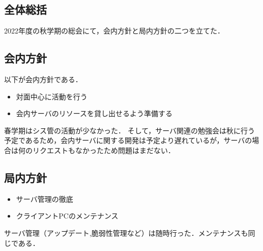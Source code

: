 \subsection*{全体総括}


2022年度の秋学期の総会にて，会内方針と局内方針の二つを立てた．

\subsection*{会内方針}
以下が会内方針である．
    \begin{itemize}
        \item 対面中心に活動を行う
        \item 会内サーバのリソースを貸し出せるよう準備する
    \end{itemize}
春学期はシス管の活動が少なかった．
そして，サーバ関連の勉強会は秋に行う予定であるため，会内サーバに関する開発は予定より遅れているが，サーバの場合は何のリクエストもなかったため問題はまだない．

\subsection*{局内方針}
    \begin{itemize}
        \item サーバ管理の徹底
        \item クライアントPCのメンテナンス
    \end{itemize}
サーバ管理（アップデート,脆弱性管理など）は随時行った．メンテナンスも同じである．
